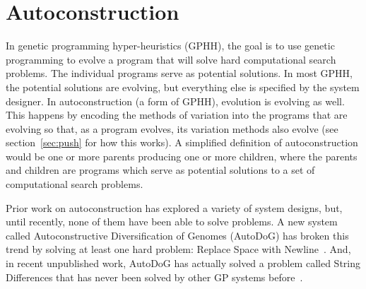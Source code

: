 \documentclass{sig-alternate}
\begin{document}
\section{Autoconstruction}
\label{sec:ac}
In genetic programming hyper-heuristics (GPHH), the goal is to use genetic programming to evolve a program that will solve hard computational search problems. The individual programs serve as potential solutions. In most GPHH, the potential solutions are evolving, but everything else is specified by the system designer.  In autoconstruction (a form of GPHH), evolution is evolving as well. This happens by encoding the methods of variation into the programs that are evolving so that, as a program evolves, its variation methods also evolve (see section~\ref{sec:push} for how this works). A simplified definition of autoconstruction would be one or more parents producing one or more children, where the parents and children are programs which serve as potential solutions to a set of computational search problems.

Prior work on autoconstruction has explored a variety of system designs, but, until recently, none of them have been able to solve  problems. A new system called Autoconstructive Diversification of Genomes (AutoDoG) has broken this trend by solving at least one hard problem: Replace Space with Newline~\cite{spector:2016}. And, in recent unpublished work, AutoDoG has actually solved a problem called String Differences that has never been solved by other GP systems before~\cite{eva:2017}.
\end{document}
